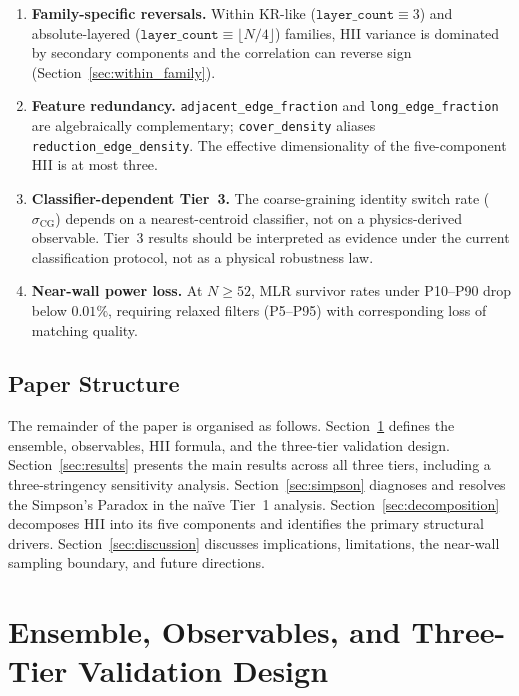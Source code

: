 \documentclass[entropy,article,submit,pdftex,moreauthors]{Definitions/mdpi}
\begin{document}
\begin{enumerate}[nosep]
    \item \textbf{Family-specific reversals.} Within KR-like ($\texttt{layer\_count} \equiv 3$) and absolute-layered ($\texttt{layer\_count} \equiv \lfloor N/4 \rfloor$) families, HII variance is dominated by secondary components and the correlation can reverse sign (Section~\ref{sec:within_family}).
    \item \textbf{Feature redundancy.} \texttt{adjacent\_edge\_fraction} and \texttt{long\_edge\_fraction} are algebraically complementary; \texttt{cover\_density} aliases \texttt{reduction\_edge\_density}. The effective dimensionality of the five-component HII is at most three.
    \item \textbf{Classifier-dependent Tier~3.} The coarse-graining identity switch rate ($\sigma_\text{CG}$) depends on a nearest-centroid classifier, not on a physics-derived observable. Tier~3 results should be interpreted as evidence under the current classification protocol, not as a physical robustness law.
    \item \textbf{Near-wall power loss.} At $N \geq 52$, MLR survivor rates under P10--P90 drop below $0.01\%$, requiring relaxed filters (P5--P95) with corresponding loss of matching quality.
\end{enumerate}

\subsection{Paper Structure}

The remainder of the paper is organised as follows. Section~\ref{sec:methods} defines the ensemble, observables, HII formula, and the three-tier validation design. Section~\ref{sec:results} presents the main results across all three tiers, including a three-stringency sensitivity analysis. Section~\ref{sec:simpson} diagnoses and resolves the Simpson's Paradox in the na\"ive Tier~1 analysis. Section~\ref{sec:decomposition} decomposes HII into its five components and identifies the primary structural drivers. Section~\ref{sec:discussion} discusses implications, limitations, the near-wall sampling boundary, and future directions.

\section{Ensemble, Observables, and Three-Tier Validation Design}\label{sec:methods}
\end{document}
